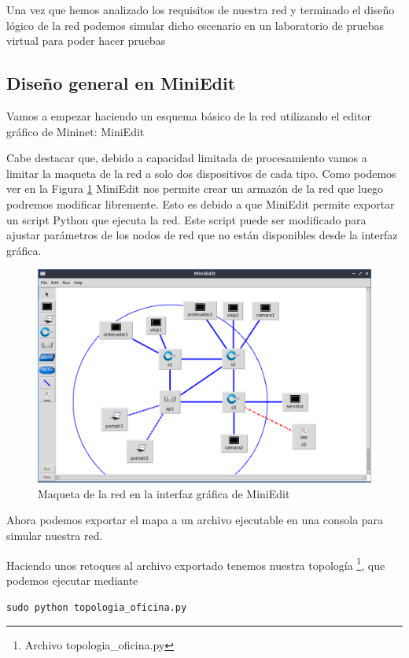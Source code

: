 Una vez que hemos analizado los requisitos de nuestra red y terminado el diseño lógico de la red podemos simular dicho escenario en un laboratorio de pruebas virtual para poder hacer pruebas 

\subsection{Diseño general en MiniEdit}
Vamos a empezar haciendo un esquema básico de la red utilizando el editor gráfico de Mininet: MiniEdit

Cabe destacar que, debido a capacidad limitada de procesamiento vamos a limitar la maqueta de la red a solo dos dispositivos de cada tipo. Como podemos ver en la Figura \ref{fig:miniedit} MiniEdit nos permite crear un armazón de la red que luego podremos modificar libremente. Esto es debido a que MiniEdit permite exportar un script Python que ejecuta la red. Este script puede ser modificado para ajustar parámetros de los nodos de red que no están disponibles desde la interfaz gráfica.

\begin{figure}[!h]
    \centering
    \includegraphics[width=\textwidth]{imagenes/figuras/miniedit.png}
    \caption{Maqueta de la red en la interfaz gráfica de MiniEdit}
    \label{fig:miniedit}
\end{figure}

Ahora podemos exportar el mapa a un archivo ejecutable en una consola para simular nuestra red.

Haciendo unos retoques al archivo exportado tenemos nuestra topología \footnote{Archivo topologia\_oficina.py}, que podemos ejecutar mediante

\lstinline{sudo python topologia_oficina.py}


